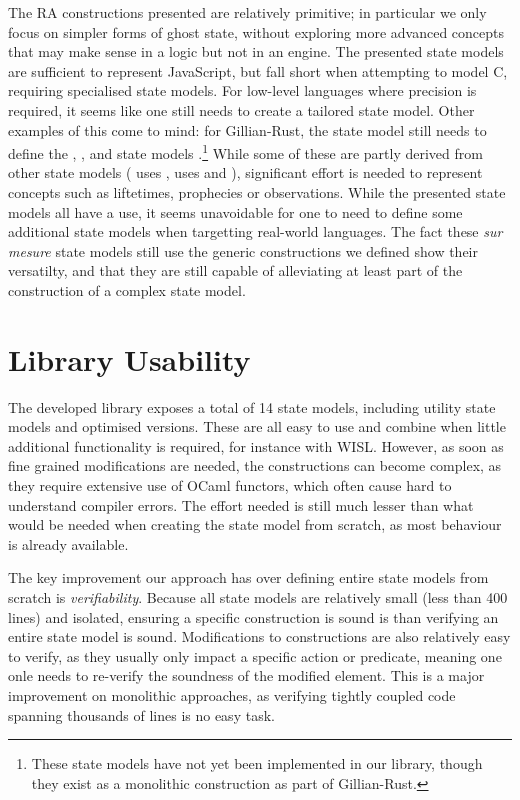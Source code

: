 The RA constructions presented are relatively primitive; in particular we only focus on simpler forms of ghost state, without exploring more advanced concepts that may make sense in a logic but not in an engine. The presented state models are sufficient to represent JavaScript, but fall short when attempting to model C, requiring specialised state models. For low-level languages where precision is required, it seems like one still needs to create a tailored state model. Other examples of this come to mind: for Gillian-Rust, the state model still needs to define the , ,  and  state models \cite{gillianrust,sacha-phd}.\footnote{These state models have not yet been implemented in our library, though they exist as a monolithic construction as part of Gillian-Rust.} While some of these are partly derived from other state models ( uses \PMap,  uses \PMap{} and \Frac{}), significant effort is needed to represent concepts such as liftetimes, prophecies or observations. While the presented state models all have a use, it seems unavoidable for one to need to define some additional state models when targetting real-world languages. The fact these \emph{sur mesure} state models still use the generic constructions we defined show their versatilty, and that they are still capable of alleviating at least part of the construction of a complex state model.

\section{Library Usability} \label{sec:usability-library}

The developed library exposes a total of 14 state models, including utility state models and optimised versions. These are all easy to use and combine when little additional functionality is required, for instance with WISL. However, as soon as fine grained modifications are needed, the constructions can become complex, as they require extensive use of OCaml functors, which often cause hard to understand compiler errors. The effort needed is still much lesser than what would be needed when creating the state model from scratch, as most behaviour is already available.

The key improvement our approach has over defining entire state models from scratch is \emph{verifiability}. Because all state models are relatively small (less than 400 lines) and isolated, ensuring a specific construction is sound is  than verifying an entire state model is sound. Modifications to constructions are also relatively easy to verify, as they usually only impact a specific action or predicate, meaning one onle needs to re-verify the soundness of the modified element. This is a major improvement on monolithic approaches, as verifying tightly coupled code spanning thousands of lines is no easy task.

